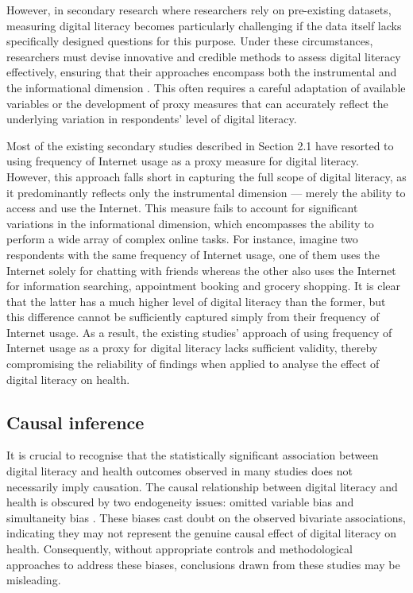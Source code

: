 However, in secondary research where researchers rely on pre-existing datasets, measuring digital literacy becomes particularly challenging if the data itself lacks specifically designed questions for this purpose. Under these circumstances, researchers must devise innovative and credible methods to assess digital literacy effectively, ensuring that their approaches encompass both the instrumental and the informational dimension \parencite{vankessel_digital_2022}. This often requires a careful adaptation of available variables or the development of proxy measures that can accurately reflect the underlying variation in respondents' level of digital literacy.

Most of the existing secondary studies described in Section 2.1 have resorted to using frequency of Internet usage as a proxy measure for digital literacy. However, this approach falls short in capturing the full scope of digital literacy, as it predominantly reflects only the instrumental dimension — merely the ability to access and use the Internet. This measure fails to account for significant variations in the informational dimension, which encompasses the ability to perform a wide array of complex online tasks. For instance, imagine two respondents with the same frequency of Internet usage, one of them uses the Internet solely for chatting with friends whereas the other also uses the Internet for information searching, appointment booking and grocery shopping. It is clear that the latter has a much higher level of digital literacy than the former, but this difference cannot be sufficiently captured simply from their frequency of Internet usage. As a result, the existing studies' approach of using frequency of Internet usage as a proxy for digital literacy lacks sufficient validity, thereby compromising the reliability of findings when applied to analyse the effect of digital literacy on health.

\subsection{Causal inference}
It is crucial to recognise that the statistically significant association between digital literacy and health outcomes observed in many studies does not necessarily imply causation. The causal relationship between digital literacy and health is obscured by two endogeneity issues: omitted variable bias \parencite{hong_digital_2017,lam_exploring_2020} and simultaneity bias \parencite{drentea_association_2008,lam_use_2009}. These biases cast doubt on the observed bivariate associations, indicating they may not represent the genuine causal effect of digital literacy on health. Consequently, without appropriate controls and methodological approaches to address these biases, conclusions drawn from these studies may be misleading.

